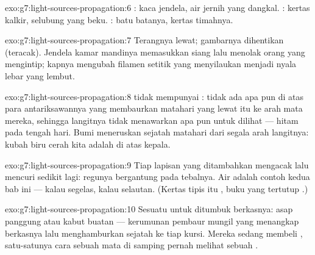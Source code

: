 \begin{solution}{exo:g7:light-sources-propagation:6}
: kaca jendela, air jernih yang dangkal. : kertas kalkir,
selubung  yang beku. : batu batanya, kertas timahnya.
\end{solution}

\begin{solution}{exo:g7:light-sources-propagation:7}
Terangnya lewat; gambarnya dihentikan (teracak). Jendela kamar
mandinya memasukkan  siang lalu menolak orang yang mengintip;
kapnya mengubah filamen setitik yang menyilaukan menjadi nyala lebar
yang lembut.
\end{solution}

\begin{solution}{exo:g7:light-sources-propagation:8}
 tidak mempunyai : tidak ada apa pun di atas para
antariksawannya yang membaurkan  matahari yang lewat itu ke arah
mata mereka, sehingga langitnya tidak menawarkan apa pun untuk dilihat
--- hitam pada tengah hari.  Bumi meneruskan sejatah 
matahari dari segala arah langitnya: kubah biru cerah kita adalah
 di atas kepala.
\end{solution}

\begin{solution}{exo:g7:light-sources-propagation:9}
Tiap lapisan yang ditambahkan mengacak lalu mencuri sedikit lagi:
regunya bergantung pada tebalnya. Air adalah contoh kedua bab ini ---
 kalau segelas,  kalau selautan. (Kertas tipis itu ,
buku yang tertutup .)
\end{solution}

\begin{solution}{exo:g7:light-sources-propagation:10}
Sesuatu untuk ditumbuk berkasnya: asap panggung atau kabut buatan ---
kerumunan pembaur mungil yang menangkap  berkasnya lalu
menghamburkan sejatah ke tiap kursi. Mereka sedang membeli ,
satu-satunya cara sebuah mata di samping pernah melihat sebuah .
\end{solution}

